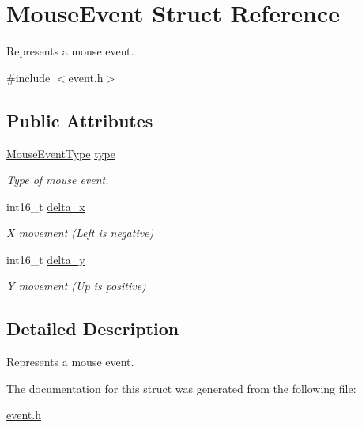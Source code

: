 \hypertarget{struct_mouse_event}{}\section{Mouse\+Event Struct Reference}
\label{struct_mouse_event}


Represents a mouse event.  




{\ttfamily \#include $<$event.\+h$>$}

\subsection*{Public Attributes}
\begin{DoxyCompactItemize}
\item 
\mbox{\hyperlink{group__event_ga262cb54ad20544f03867d1962cdf9ec9}{Mouse\+Event\+Type}} \mbox{\hyperlink{group__event_ga44b4240ab9b63b86e68d3e0ba4b64407}{type}}
\begin{DoxyCompactList}\small\item\em Type of mouse event. \end{DoxyCompactList}\item 
int16\+\_\+t \mbox{\hyperlink{group__event_ga41f621f2189d0bc748e80c1ddc89d292}{delta\+\_\+x}}
\begin{DoxyCompactList}\small\item\em X movement (Left is negative) \end{DoxyCompactList}\item 
int16\+\_\+t \mbox{\hyperlink{group__event_ga3420770b5a1a73976be777d8bd7a3c4c}{delta\+\_\+y}}
\begin{DoxyCompactList}\small\item\em Y movement (Up is positive) \end{DoxyCompactList}\end{DoxyCompactItemize}


\subsection{Detailed Description}
Represents a mouse event. 

The documentation for this struct was generated from the following file\+:\begin{DoxyCompactItemize}
\item 
\mbox{\hyperlink{event_8h}{event.\+h}}\end{DoxyCompactItemize}
